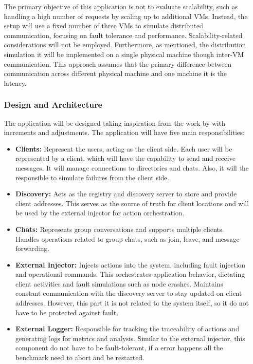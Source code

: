 The primary objective of this application is not to evaluate scalability, such as handling a high number of requests by scaling up to additional \glspl{VM}. Instead, the setup will use a fixed number of three \glspl{VM} to simulate distributed communication, focusing on fault tolerance and performance. Scalability-related considerations will not be employed. Furthermore, as mentioned, the distribution simulation it will be implemented on a single physical machine though inter-VM communication. This approach assumes that the primary difference between communication across different physical machine and one machine it is the latency.

\subsubsection{Design and Architecture}

The application will be designed taking inspiration from the work by \textcite{Randtoul2022} with increments and adjustments. The application will have five main responsibilities:

\begin{itemize}
    \item \textbf{Clients:} Represent the users, acting as the client side. Each user will be represented by a client, which will have the capability to send and receive messages. It will manage connections to directories and chats. Also, it will the responsible to simulate failures from the client side.

    \item \textbf{Discovery:} Acts as the registry and discovery server to store and provide client addresses. This serves as the source of truth for client locations and will be used by the external injector for action orchestration.

    \item \textbf{Chats:} Represents group conversations and supports multiple clients. Handles operations related to group chats, such as join, leave, and message forwarding.

    \item \textbf{External Injector:} Injects actions into the system, including fault injection and operational commands. This orchestrates application behavior, dictating client activities and fault simulations such as node crashes. Maintains constant communication with the discovery server to stay updated on client addresses. However, this part it is not related to the system itself, so it do not have to be protected against fault.

    \item \textbf{External Logger:} Responsible for tracking the traceability of actions and generating logs for metrics and analysis. Similar to the external injector, this component do not have to be fault-tolerant, if a error happens all the benchmark need to abort and be restarted.
\end{itemize}

